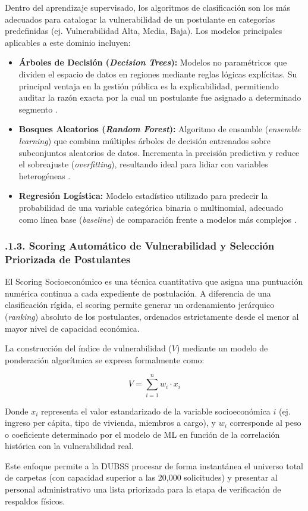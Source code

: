 Dentro del aprendizaje supervisado, los algoritmos de clasificación son los más adecuados para catalogar la vulnerabilidad de un postulante en categorías predefinidas (ej. Vulnerabilidad Alta, Media, Baja). Los modelos principales aplicables a este dominio incluyen:

\begin{itemize}
    \item \textbf{Árboles de Decisión (\textit{Decision Trees}):} Modelos no paramétricos que dividen el espacio de datos en regiones mediante reglas lógicas explícitas. Su principal ventaja en la gestión pública es la explicabilidad, permitiendo auditar la razón exacta por la cual un postulante fue asignado a determinado segmento \parencite{breiman1984cart}.

    \item \textbf{Bosques Aleatorios (\textit{Random Forest}):} Algoritmo de ensamble (\textit{ensemble learning}) que combina múltiples árboles de decisión entrenados sobre subconjuntos aleatorios de datos. Incrementa la precisión predictiva y reduce el sobreajuste (\textit{overfitting}), resultando ideal para lidiar con variables heterogéneas \parencite{breiman2001randomforest}.

    \item \textbf{Regresión Logística:} Modelo estadístico utilizado para predecir la probabilidad de una variable categórica binaria o multinomial, adecuado como línea base (\textit{baseline}) de comparación frente a modelos más complejos \parencite{james2013statlearning}.
\end{itemize}

\subsubsection{.1.3. Scoring Automático de Vulnerabilidad y Selección Priorizada de Postulantes}\label{sec:ia_scoring_vulnerabilidad}

El Scoring Socioeconómico es una técnica cuantitativa que asigna una puntuación numérica continua a cada expediente de postulación. A diferencia de una clasificación rígida, el scoring permite generar un ordenamiento jerárquico (\textit{ranking}) absoluto de los postulantes, ordenados estrictamente desde el menor al mayor nivel de capacidad económica.

\begin{samepage}
La construcción del índice de vulnerabilidad ($V$) mediante un modelo de ponderación algorítmica se expresa formalmente como:

\[
V = \sum_{i=1}^{n} w_i \cdot x_i
\]
\end{samepage}

Donde $x_i$ representa el valor estandarizado de la variable socioeconómica $i$ (ej. ingreso per cápita, tipo de vivienda, miembros a cargo), y $w_i$ corresponde al peso o coeficiente determinado por el modelo de ML en función de la correlación histórica con la vulnerabilidad real.

Este enfoque permite a la DUBSS procesar de forma instantánea el universo total de carpetas (con capacidad superior a las 20,000 solicitudes) y presentar al personal administrativo una lista priorizada para la etapa de verificación de respaldos físicos.
